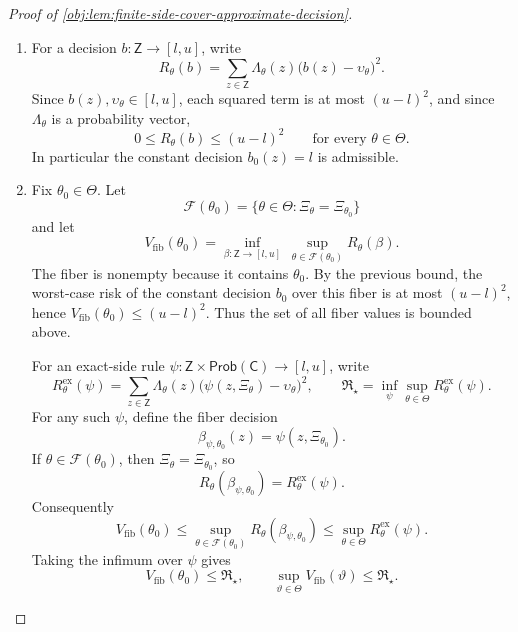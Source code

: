 \begin{proof}[Proof of \cref{obj:lem:finite-side-cover-approximate-decision}]
\begin{enumerate}
\item For a decision \(b:\mathsf Z\to[l,u]\), write
\[
R_\theta(b)
=
\sum_{z\in\mathsf Z}\Lambda_\theta(z)\bigl(b(z)-\upsilon_\theta\bigr)^2 .
\]
Since \(b(z),\upsilon_\theta\in[l,u]\), each squared term is at most \((u-l)^2\), and since \(\Lambda_\theta\) is a probability vector,
\[
0\le R_\theta(b)\le (u-l)^2
\qquad\text{for every }\theta\in\Theta .
\]
In particular the constant decision \(b_0(z)=l\) is admissible. %

\item Fix \(\theta_0\in\Theta\). Let
\[
\mathcal F(\theta_0)
=
\{\theta\in\Theta:\Xi_\theta=\Xi_{\theta_0}\}
\]
and let
\[
V_{\mathrm{fib}}(\theta_0)
=
\inf_{\beta:\mathsf Z\to[l,u]}\ \sup_{\theta\in\mathcal F(\theta_0)} R_\theta(\beta).
\]
The fiber is nonempty because it contains \(\theta_0\). By the previous bound, the worst-case risk of the constant decision \(b_0\) over this fiber is at most \((u-l)^2\), hence \(V_{\mathrm{fib}}(\theta_0)\le (u-l)^2\). Thus the set of all fiber values is bounded above.

For an exact-side rule \(\psi:\mathsf Z\times\mathsf{Prob}(\mathsf C)\to[l,u]\), write
\[
R^{\mathrm{ex}}_\theta(\psi)
=
\sum_{z\in\mathsf Z}\Lambda_\theta(z)
\bigl(\psi(z,\Xi_\theta)-\upsilon_\theta\bigr)^2,
\qquad
\mathfrak R_\star
=
\inf_\psi\sup_{\theta\in\Theta}R^{\mathrm{ex}}_\theta(\psi).
\]
For any such \(\psi\), define the fiber decision
\[
\beta_{\psi,\theta_0}(z)=\psi(z,\Xi_{\theta_0}).
\]
If \(\theta\in\mathcal F(\theta_0)\), then \(\Xi_\theta=\Xi_{\theta_0}\), so
\[
R_\theta(\beta_{\psi,\theta_0})=R^{\mathrm{ex}}_\theta(\psi).
\]
Consequently
\[
V_{\mathrm{fib}}(\theta_0)
\le
\sup_{\theta\in\mathcal F(\theta_0)}R_\theta(\beta_{\psi,\theta_0})
\le
\sup_{\theta\in\Theta}R^{\mathrm{ex}}_\theta(\psi).
\]
Taking the infimum over \(\psi\) gives
\[
V_{\mathrm{fib}}(\theta_0)\le \mathfrak R_\star,
\qquad
\sup_{\vartheta\in\Theta}V_{\mathrm{fib}}(\vartheta)\le \mathfrak R_\star.
\]


\end{enumerate}
\end{proof}
